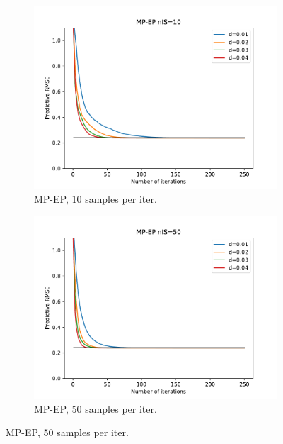 \begin{landscape}
\begin{figure}[ht]
	\begin{subfigure}[b]{0.45\textwidth}
		\includegraphics[width=\textwidth]{figures/snep/rms-mpep-nis10}
		\caption{MP-EP, 10 samples per iter.}
		\label{res-mpep-10}
	\end{subfigure}
	\begin{subfigure}[b]{0.45\textwidth}
		\includegraphics[width=\textwidth]{figures/snep/rms-mpep-nis50}
		\caption{MP-EP, 50 samples per iter.}
		\label{res-mpep-50}
	\end{subfigure}


\end{figure}
\end{landscape}

